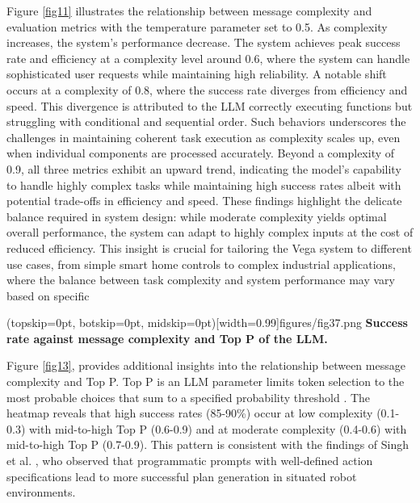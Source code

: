 \documentclass{ieeeaccess}
\begin{document}
Figure \ref{fig11} illustrates the relationship between message complexity and evaluation metrics with the temperature parameter set to 0.5. As complexity increases, the system's performance decrease. The system achieves peak success rate and efficiency at a complexity level around 0.6, where the system can handle sophisticated user requests while maintaining high reliability. A notable shift occurs at a complexity of 0.8, where the success rate diverges from efficiency and speed. This divergence is attributed to the LLM correctly executing functions but struggling with conditional and sequential order. Such behaviors underscores the challenges in maintaining coherent task execution as complexity scales up, even when individual components are processed accurately. Beyond a complexity of 0.9, all three metrics exhibit an upward trend, indicating the model's capability to handle highly complex tasks while maintaining high success rates albeit with potential trade-offs in efficiency and speed. These findings highlight the delicate balance required in system design: while moderate complexity yields optimal overall performance, the system can adapt to highly complex inputs at the cost of reduced efficiency. This insight is crucial for tailoring the Vega system to different use cases, from simple smart home controls to complex industrial applications, where the balance between task complexity and system performance may vary based on specific 





\Figure[h!](topskip=0pt, botskip=0pt,
midskip=0pt)[width=0.99\columnwidth]{{figures/fig37.png}}
{ \textbf{Success rate against message complexity and Top P of the LLM.}\label{fig13}}

Figure \ref{fig13}, provides additional insights into the relationship between message complexity and Top P. Top P is an LLM parameter limits token selection to the most probable choices that sum to a specified probability threshold \cite{rum2024setting}. The heatmap reveals that high success rates (85-90\%) occur at low complexity (0.1-0.3) with mid-to-high Top P (0.6-0.9) and at moderate complexity (0.4-0.6) with mid-to-high Top P (0.7-0.9). This pattern is consistent with the findings of Singh et al. \cite{Singh2023}, who observed that programmatic prompts with well-defined action specifications lead to more successful plan generation in situated robot environments.
\end{document}
